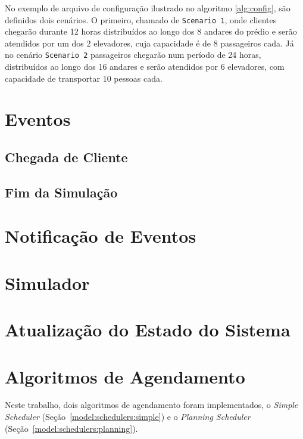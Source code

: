 No exemplo de arquivo de configuração ilustrado no algoritmo \ref{alg:config},
são definidos dois cenários. O primeiro, chamado de \texttt{Scenario 1}, onde
clientes chegarão durante 12 horas distribuídos ao longo dos 8 andares do prédio
e serão atendidos por um dos 2 elevadores, cuja capacidade é de 8 passageiros
cada. Já no cenário \texttt{Scenario 2} passageiros chegarão num período de 24
horas, distribuídos ao longo dos 16 andares e serão atendidos por 6 elevadores,
com capacidade  de transportar 10 pessoas cada.

\section{\label{model:events}Eventos}
\lipsum[2]

\subsection{\label{model:events:clientarrival}Chegada de Cliente}
\lipsum[1]

\subsection{\label{model:events:end}Fim da Simulação}
\lipsum[1]

\section{\label{model:notification}Notificação de Eventos}
\lipsum[3]

\section{\label{model:simulator}Simulador}
\lipsum[6]

\section{\label{model:state}Atualização do Estado do Sistema}
\lipsum[1]

\section{\label{model:schedulers}Algoritmos de Agendamento}
Neste trabalho, dois algoritmos de agendamento foram implementados, o
\textit{Simple Scheduler} (Seção~\ref{model:schedulers:simple}) e o
\textit{Planning Scheduler} (Seção~\ref{model:schedulers:planning}).

